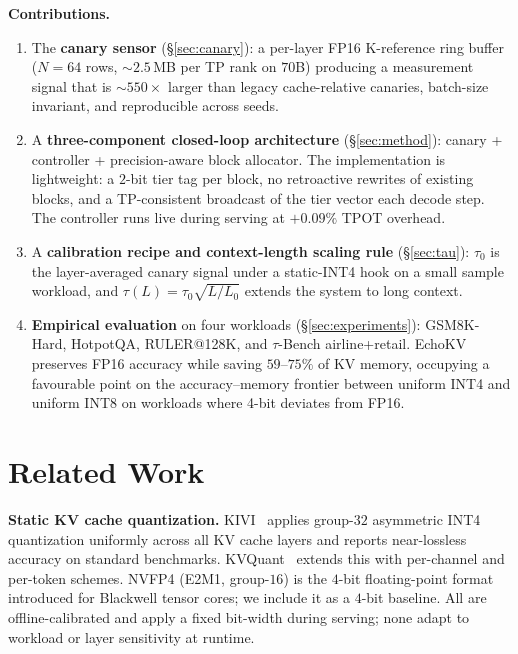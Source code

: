 \documentclass{article}
\begin{document}
\textbf{Contributions.}
\begin{enumerate}[leftmargin=2em]
  \item The \textbf{canary sensor} (\S\ref{sec:canary}): a per-layer FP16
        K-reference ring buffer ($N{=}64$ rows, ${\sim}2.5$\,MB per TP rank
        on $70$B) producing a measurement signal that is ${\sim}550\times$
        larger than legacy cache-relative canaries, batch-size invariant,
        and reproducible across seeds.
  \item A \textbf{three-component closed-loop architecture}
        (\S\ref{sec:method}): canary + controller + precision-aware block
        allocator. The implementation is lightweight: a $2$-bit tier tag
        per block, no retroactive rewrites of existing blocks, and a
        TP-consistent broadcast of the tier vector each decode step. The controller
        runs live during serving at $+0.09\%$ TPOT overhead.
  \item A \textbf{calibration recipe and context-length scaling rule}
        (\S\ref{sec:tau}): $\tau_0$ is the layer-averaged canary signal under
        a static-INT4 hook on a small sample workload, and
        $\tau(L) = \tau_0 \sqrt{L/L_0}$ extends the system to long context.
  \item \textbf{Empirical evaluation} on four workloads
        (\S\ref{sec:experiments}): GSM8K-Hard, HotpotQA, RULER@128K, and
        $\tau$-Bench airline+retail. EchoKV preserves FP16 accuracy while
        saving $59$--$75\%$ of KV memory, occupying a favourable point on
        the accuracy--memory frontier between uniform INT4 and uniform INT8
        on workloads where 4-bit deviates from FP16.
\end{enumerate}

\section{Related Work}
\label{sec:related}

\textbf{Static KV cache quantization.} KIVI~\cite{liu2024kivi} applies
group-$32$ asymmetric INT4 quantization uniformly across all KV cache layers
and reports near-lossless accuracy on standard benchmarks.
KVQuant~\cite{hooper2024kvquant} extends this with per-channel and per-token
schemes. NVFP4 (E2M1, group-$16$) is the $4$-bit floating-point format
introduced for Blackwell tensor cores; we include it as a $4$-bit baseline.
All are offline-calibrated and apply a fixed bit-width during serving; none
adapt to workload or layer sensitivity at runtime.
\end{document}
